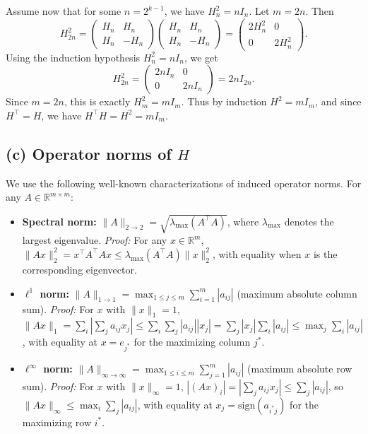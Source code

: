 Assume now that for some $n=2^{k-1}$, we have $H_n^2=nI_n$. Let $m=2n$. Then
\[
H_{2n}^2 = \begin{pmatrix} H_n & H_n\\ H_n & -H_n \end{pmatrix} \begin{pmatrix} H_n & H_n\\ H_n & -H_n \end{pmatrix} = \begin{pmatrix} 2H_n^2 & 0\\ 0 & 2H_n^2 \end{pmatrix}.
\]
Using the induction hypothesis $H_n^2=nI_n$, we get
\[
H_{2n}^2 = \begin{pmatrix} 2nI_n & 0\\ 0 & 2nI_n \end{pmatrix} = 2nI_{2n}.
\]
Since $m=2n$, this is exactly $H_m^2=mI_m$. Thus by induction $H^2=mI_m$, and since $H^\top=H$, we have $H^\top H=H^2=mI_m$.

\subsection*{(c) Operator norms of $H$}

We use the following well-known characterizations of induced operator norms. For any $A\in\mathbb{R}^{m\times m}$:
\begin{itemize}
\item \textbf{Spectral norm:} $\|A\|_{2\to 2} = \sqrt{\lambda_{\max}(A^\top A)}$, where $\lambda_{\max}$ denotes the largest eigenvalue. \textit{Proof:} For any $x\in\mathbb{R}^m$, $\|Ax\|_2^2 = x^\top A^\top A x \leq \lambda_{\max}(A^\top A)\|x\|_2^2$, with equality when $x$ is the corresponding eigenvector.
\item \textbf{$\ell^1$ norm:} $\|A\|_{1\to 1} = \max_{1\leq j\leq m}\sum_{i=1}^m |a_{ij}|$ (maximum absolute column sum). \textit{Proof:} For $x$ with $\|x\|_1=1$, $\|Ax\|_1 = \sum_i|\sum_j a_{ij}x_j| \leq \sum_i\sum_j|a_{ij}||x_j| = \sum_j|x_j|\sum_i|a_{ij}| \leq \max_j\sum_i|a_{ij}|$, with equality at $x=e_{j^*}$ for the maximizing column $j^*$.
\item \textbf{$\ell^\infty$ norm:} $\|A\|_{\infty\to\infty} = \max_{1\leq i\leq m}\sum_{j=1}^m |a_{ij}|$ (maximum absolute row sum). \textit{Proof:} For $x$ with $\|x\|_\infty=1$, $|(Ax)_i| = |\sum_j a_{ij}x_j| \leq \sum_j|a_{ij}|$, so $\|Ax\|_\infty \leq \max_i\sum_j|a_{ij}|$, with equality at $x_j = \mathrm{sign}(a_{i^*j})$ for the maximizing row $i^*$.
\end{itemize}

